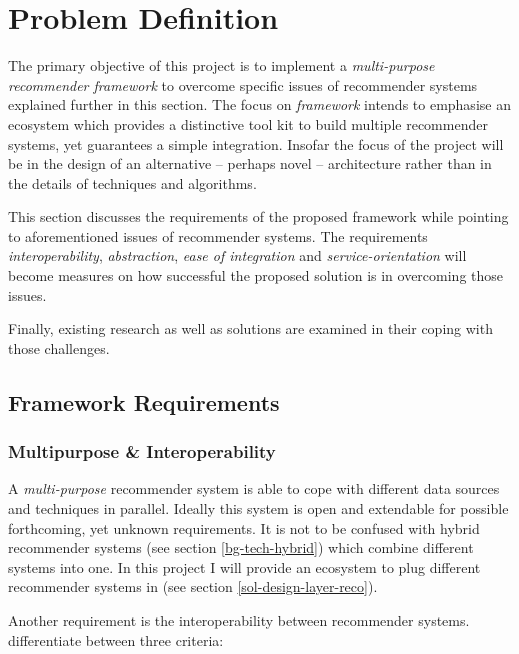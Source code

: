 \chapter{Problem Definition}
\label{problem}

The primary objective of this project is to implement a \textit{multi-purpose recommender framework} to overcome specific issues of recommender systems explained further in this section. The focus on \emph{framework} intends to emphasise an ecosystem which provides a distinctive tool kit to build multiple recommender systems, yet guarantees a simple integration. Insofar the focus of the project will be in the design of an alternative -- perhaps novel -- architecture rather than in the details of techniques and algorithms.

This section discusses the requirements of the proposed framework while pointing to aforementioned issues of recommender systems. The requirements \emph{interoperability}, \emph{abstraction}, \emph{ease of integration} and \emph{service-orientation} will become measures on how successful the proposed solution is in overcoming those issues.

Finally, existing research as well as solutions are examined in their coping with those challenges.



\section{Framework Requirements}

\subsection{Multipurpose \& Interoperability}
\label{problem-multipurpose}

A \emph{multi-purpose} recommender system is able to cope with different data sources and techniques in parallel. Ideally this system is open and extendable for possible forthcoming, yet unknown requirements. It is not to be confused with hybrid recommender systems (see section \ref{bg-tech-hybrid}) which combine different systems into one. In this project I will provide an ecosystem to plug different recommender systems in (see section \ref{sol-design-layer-reco}).

Another requirement is the interoperability between recommender systems. \citet{manouselis07} differentiate between three criteria:

